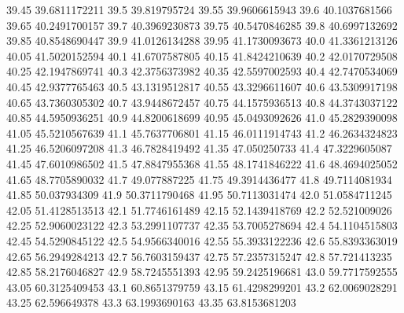           39.45    39.6811172211
           39.5     39.819795724
          39.55    39.9606615943
           39.6    40.1037681566
          39.65    40.2491700157
           39.7    40.3969230873
          39.75    40.5470846285
           39.8    40.6997132692
          39.85    40.8548690447
           39.9    41.0126134288
          39.95    41.1730093673
           40.0    41.3361213126
          40.05    41.5020152594
           40.1    41.6707587805
          40.15    41.8424210639
           40.2    42.0170729508
          40.25    42.1947869741
           40.3    42.3756373982
          40.35    42.5597002593
           40.4    42.7470534069
          40.45    42.9377765463
           40.5    43.1319512817
          40.55    43.3296611607
           40.6    43.5309917198
          40.65    43.7360305302
           40.7    43.9448672457
          40.75    44.1575936513
           40.8    44.3743037122
          40.85    44.5950936251
           40.9    44.8200618699
          40.95    45.0493092626
           41.0    45.2829390098
          41.05    45.5210567639
           41.1    45.7637706801
          41.15    46.0111914743
           41.2    46.2634324823
          41.25    46.5206097208
           41.3    46.7828419492
          41.35     47.050250733
           41.4    47.3229605087
          41.45    47.6010986502
           41.5    47.8847955368
          41.55    48.1741846222
           41.6    48.4694025052
          41.65    48.7705890032
           41.7     49.077887225
          41.75    49.3914436477
           41.8    49.7114081934
          41.85     50.037934309
           41.9    50.3711790468
          41.95    50.7113031474
           42.0    51.0584711245
          42.05    51.4128513513
           42.1    51.7746161489
          42.15    52.1439418769
           42.2     52.521009026
          42.25    52.9060023122
           42.3    53.2991107737
          42.35    53.7005278694
           42.4    54.1104515803
          42.45    54.5290845122
           42.5    54.9566340016
          42.55    55.3933122236
           42.6    55.8393363019
          42.65    56.2949284213
           42.7    56.7603159437
          42.75    57.2357315247
           42.8     57.721413235
          42.85    58.2176046827
           42.9    58.7245551393
          42.95    59.2425196681
           43.0    59.7717592555
          43.05    60.3125409453
           43.1    60.8651379759
          43.15    61.4298299201
           43.2    62.0069028291
          43.25     62.596649378
           43.3    63.1993690163
          43.35    63.8153681203

